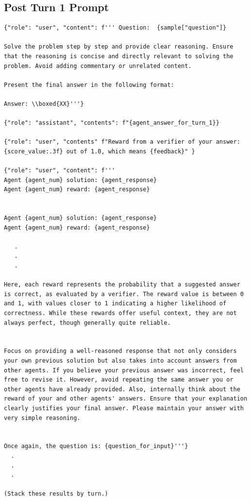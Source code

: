 \subsection{Post Turn 1 Prompt}
\begin{lstlisting}[breaklines=true]
{"role": "user", "content": f''' Question:  {sample["question"]}

Solve the problem step by step and provide clear reasoning. Ensure that the reasoning is concise and directly relevant to solving the problem. Avoid adding commentary or unrelated content.

Present the final answer in the following format:

Answer: \\boxed{XX}'''}

{"role": "assistant", "contents": f"{agent_answer_for_turn_1}}

{"role": "user", "contents" f"Reward from a verifier of your answer: {score_value:.3f} out of 1.0, which means {feedback}" }

{"role": "user", "content": f'''       
Agent {agent_num} solution: {agent_response}
Agent {agent_num} reward: {agent_response}


Agent {agent_num} solution: {agent_response}
Agent {agent_num} reward: {agent_response}

   . 
   .
   .
   
Here, each reward represents the probability that a suggested answer is correct, as evaluated by a verifier. The reward value is between 0 and 1, with values closer to 1 indicating a higher likelihood of correctness. While these rewards offer useful context, they are not always perfect, though generally quite reliable.

            
Focus on providing a well-reasoned response that not only considers your own previous solution but also takes into account answers from other agents. If you believe your previous answer was incorrect, feel free to revise it. However, avoid repeating the same answer you or other agents have already provided. Also, internally think about the reward of your and other agents' answers. Ensure that your explanation clearly justifies your final answer. Please maintain your answer with very simple reasoning.


Once again, the question is: {question_for_input}'''}
  .
  .
  .

(Stack these results by turn.)

\end{lstlisting}

